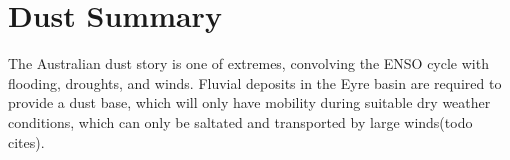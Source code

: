 \section{Dust Summary}

The Australian dust story is one of extremes, convolving the ENSO cycle with flooding, droughts, and winds. Fluvial deposits in the Eyre basin are required to provide a dust base, which will only have mobility during suitable dry weather conditions, which can only be saltated and transported by large winds(todo cites).